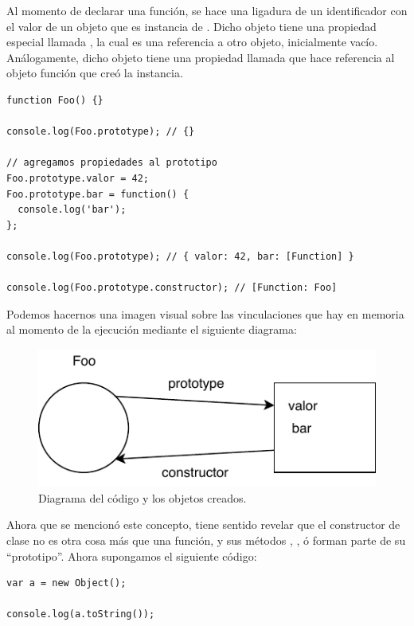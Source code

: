 Al momento de declarar una función, se hace una ligadura de un identificador con el valor de un objeto que es instancia de . Dicho objeto tiene una propiedad especial llamada , la cual es una referencia a otro objeto, inicialmente vacío. Análogamente, dicho objeto tiene una propiedad llamada  que hace referencia al objeto función que creó la instancia.

\begin{lstlisting}[title={Analizando el \code{prototype} de una función}]
function Foo() {}

console.log(Foo.prototype); // {}

// agregamos propiedades al prototipo
Foo.prototype.valor = 42;
Foo.prototype.bar = function() {
  console.log('bar');
};

console.log(Foo.prototype); // { valor: 42, bar: [Function] }

console.log(Foo.prototype.constructor); // [Function: Foo]

\end{lstlisting}

Podemos hacernos una imagen visual sobre las vinculaciones que hay en memoria al momento de la ejecución mediante el siguiente diagrama:

\begin{figure}[th]
\centering
\includegraphics{Figures/Prototype}
\decoRule
\caption[]{Diagrama del código y los objetos creados.}
\label{fig:prototype}
\end{figure}

Ahora que se mencionó este concepto, tiene sentido revelar que el constructor de clase  no es otra cosa más que una función, y sus métodos , , ó  forman parte de su "`prototipo"'. Ahora supongamos el siguiente código:

\begin{lstlisting}
var a = new Object();

console.log(a.toString());
\end{lstlisting}


